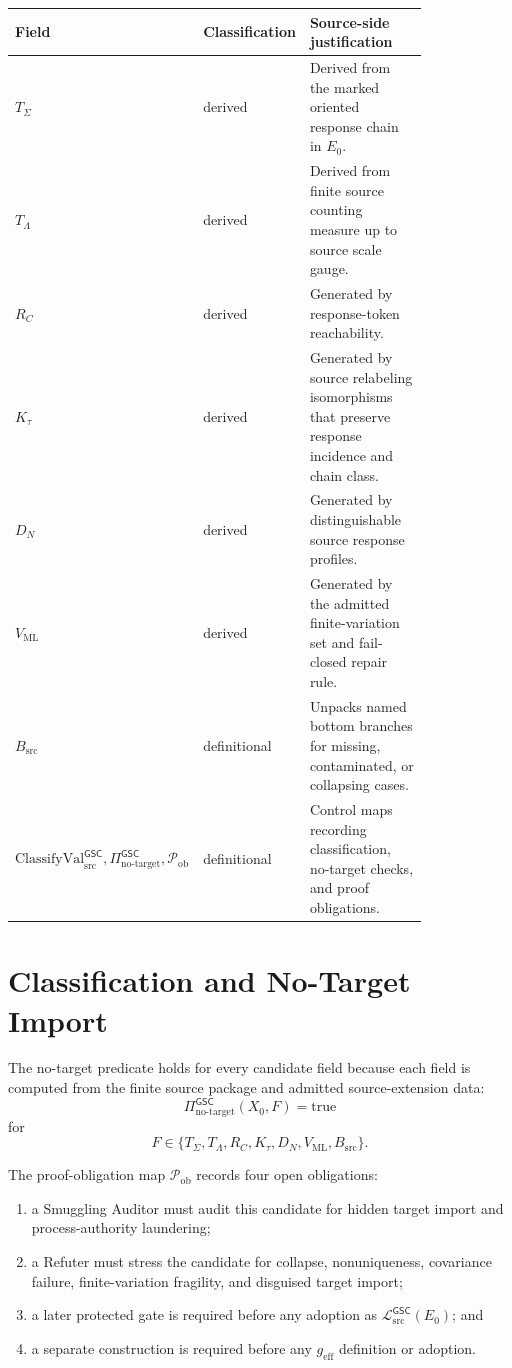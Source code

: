 \documentclass[11pt]{article}
\newcommand{\MetricData}{\mathcal{L}_{\mathrm{src}}^{\mathsf{GSC}}}
\newcommand{\ClassVal}{\mathrm{ClassifyVal}_{\mathrm{src}}^{\mathsf{GSC}}}
\newcommand{\NoTarget}{\Pi_{\mathrm{no\mbox{-}target}}^{\mathsf{GSC}}}
\newcommand{\Pob}{\mathcal{P}_{\mathrm{ob}}}
\newcommand{\geff}{g_{\mathrm{eff}}}
\newcommand{\Ezero}{E_{0}}
\begin{document}
\begin{longtable}{p{0.16\linewidth}p{0.20\linewidth}p{0.46\linewidth}}
\toprule
Field & Classification & Source-side justification \\
\midrule
\(T_{\Sigma}\) & derived &
Derived from the marked oriented response chain in \(\Ezero\). \\
\(T_{\Lambda}\) & derived &
Derived from finite source counting measure up to source scale gauge. \\
\(R_C\) & derived &
Generated by response-token reachability. \\
\(K_{\tau}\) & derived &
Generated by source relabeling isomorphisms that preserve response incidence
and chain class. \\
\(D_N\) & derived &
Generated by distinguishable source response profiles. \\
\(V_{\mathrm{ML}}\) & derived &
Generated by the admitted finite-variation set and fail-closed repair rule. \\
\(B_{\mathrm{src}}\) & definitional &
Unpacks named bottom branches for missing, contaminated, or collapsing cases. \\
\(\ClassVal,\NoTarget,\Pob\) & definitional &
Control maps recording classification, no-target checks, and proof
obligations. \\
\bottomrule
\end{longtable}

\section{Classification and No-Target Import}\label{classification-and-no-target-import}

The no-target predicate holds for every candidate field because each field is
computed from the finite source package and admitted source-extension data:
\[
  \NoTarget(X_0,F)=\mathrm{true}
\]
for
\[
F\in\{T_{\Sigma},T_{\Lambda},R_C,K_{\tau},D_N,V_{\mathrm{ML}},
B_{\mathrm{src}}\}.
\]

The proof-obligation map \(\Pob\) records four open obligations:
\begin{enumerate}[leftmargin=*]
  \item a Smuggling Auditor must audit this candidate for hidden target import
  and process-authority laundering;
  \item a Refuter must stress the candidate for collapse, nonuniqueness,
  covariance failure, finite-variation fragility, and disguised target import;
  \item a later protected gate is required before any adoption as
  \(\MetricData(\Ezero)\); and
  \item a separate construction is required before any \(\geff\) definition
  or adoption.
\end{enumerate}
\end{document}
